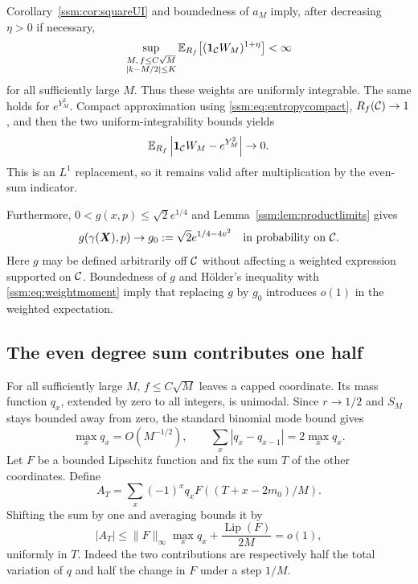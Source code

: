 Corollary~\ref{ssm:cor:squareUI} and boundedness of $a_M$ imply, after decreasing $\eta>0$ if necessary,
\begin{equation}\label{ssm:eq:weightmoment}
 \sup_{\substack{M,\,f\le C\sqrt M\\ |k-M/2|\le K}}
 \mathbb E_{R_f}\bigl[(\mathbf1_{\mathcal C}W_M)^{1+\eta}\bigr]<\infty
\end{equation}
for all sufficiently large $M$. Thus these weights are uniformly integrable. The same holds for $e^{Y_M^2}$. Compact approximation using \eqref{ssm:eq:entropycompact}, $R_f(\mathcal C)\to1$, and then the two uniform-integrability bounds yields
\begin{equation}\label{ssm:eq:L1}
 \mathbb E_{R_f}\left|\mathbf1_{\mathcal C}W_M-e^{Y_M^2}\right|\to0.
\end{equation}
This is an $L^1$ replacement, so it remains valid after multiplication by the even-sum indicator.

Furthermore, $0<g(x,p)\le\sqrt2e^{1/4}$ and Lemma~\ref{ssm:lem:productlimits} gives
\begin{equation}\label{ssm:eq:gzero}
 g(\gamma(\boldsymbol X),p)\to g_0:=\sqrt2e^{1/4-4v^2}
 \quad\text{in probability on }\mathcal C.
\end{equation}
Here $g$ may be defined arbitrarily off $\mathcal C$ without affecting a weighted expression supported on $\mathcal C$. Boundedness of $g$ and H\"older's inequality with \eqref{ssm:eq:weightmoment} imply that replacing $g$ by $g_0$ introduces $o(1)$ in the weighted expectation.

\subsection{The even degree sum contributes one half}
For all sufficiently large $M$, $f\le C\sqrt M$ leaves a capped coordinate. Its mass function $q_x$, extended by zero to all integers, is unimodal. Since $r\to1/2$ and $S_M$ stays bounded away from zero, the standard binomial mode bound gives
\[
 \max_xq_x=O(M^{-1/2}),\qquad
 \sum_x|q_x-q_{x-1}|=2\max_xq_x.
\]
Let $F$ be a bounded Lipschitz function and fix the sum $T$ of the other coordinates. Define
\[
 A_T=\sum_x(-1)^xq_x F((T+x-2m_0)/M).
\]
Shifting the sum by one and averaging bounds it by
\begin{equation}\label{ssm:eq:alternation}
 |A_T|\le\|F\|_\infty\max_xq_x+\frac{\operatorname{Lip}(F)}{2M}=o(1),
\end{equation}
uniformly in $T$. Indeed the two contributions are respectively half the total variation of $q$ and half the change in $F$ under a step $1/M$.


